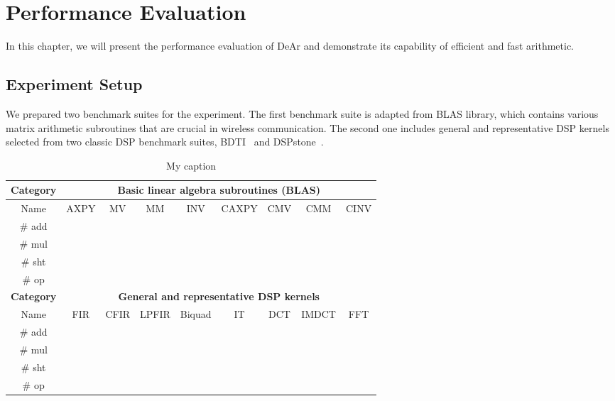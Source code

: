 \chapter{Performance Evaluation}
In this chapter, we will present the performance evaluation of DeAr and demonstrate its capability of efficient and fast arithmetic.
\section{Experiment Setup}
\label{sec:evaluation:setup}
We prepared two benchmark suites for the experiment.
The first benchmark suite is adapted from BLAS library, 
which contains various matrix arithmetic subroutines that are crucial in wireless communication.
The second one includes general and representative DSP kernels selected from two classic DSP benchmark suites, BDTI~\cite{btdi} and DSPstone~\cite{dspstone}.
\begin{table}[]
    \centering
    \caption{My caption}
    \label{my-label}
    \begin{tabular}{|c|c|c|c|c|c|c|c|c|}
        \hline
        \textbf{Category} & \multicolumn{8}{c|}{\textbf{Basic linear algebra subroutines (BLAS)}} \\ \hline
        Name              & AXPY   & MV     & MM      & INV      & CAXPY  & CMV  & CMM    & CINV  \\ \hline
        \# add            &        &        &         &          &        &      &        &       \\ \hline
        \# mul            &        &        &         &          &        &      &        &       \\ \hline
        \# sht            &        &        &         &          &        &      &        &       \\ \hline
        \# op             &        &        &         &          &        &      &        &       \\ \hline
        \textbf{Category} & \multicolumn{8}{c|}{\textbf{General and representative DSP kernels}}                     \\ \hline
        Name              & FIR    & CFIR   & LPFIR   & Biquad   & IT     & DCT  & IMDCT  & FFT   \\ \hline
        \# add            &        &        &         &          &        &      &        &       \\ \hline
        \# mul            &        &        &         &          &        &      &        &       \\ \hline
        \# sht            &        &        &         &          &        &      &        &       \\ \hline
        \# op             &        &        &         &          &        &      &        &       \\ \hline
    \end{tabular}
\end{table}
